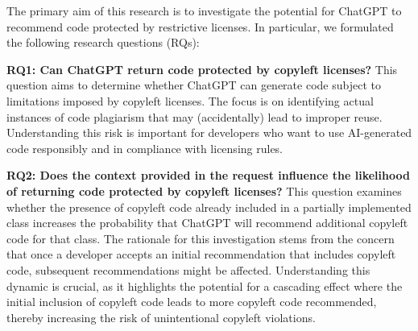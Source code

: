 \label{sec:Met}
The primary aim of this research is to investigate the potential for ChatGPT to recommend code protected by restrictive licenses. In particular, we formulated the following research questions (RQs):


    \noindent  \textbf{RQ1: Can ChatGPT return code protected by copyleft licenses?} This question aims to determine whether ChatGPT can generate code subject to limitations imposed by copyleft licenses. The focus is on identifying actual instances of code plagiarism that may (accidentally) lead to improper reuse. Understanding this risk is important for developers who want to use AI-generated code responsibly and in compliance with licensing rules.




    \noindent  \textbf{RQ2: Does the context provided in the request influence the likelihood of returning code protected by copyleft licenses?} This question examines whether the presence of copyleft code already included in a partially implemented class increases the probability that ChatGPT will recommend additional copyleft code for that class. The rationale for this investigation stems from the concern that once a developer accepts an initial recommendation that includes copyleft code, subsequent recommendations might be affected. Understanding this dynamic is crucial, as it highlights the potential for a cascading effect where the initial inclusion of copyleft code leads to more copyleft code recommended, thereby increasing the risk of unintentional copyleft violations.

